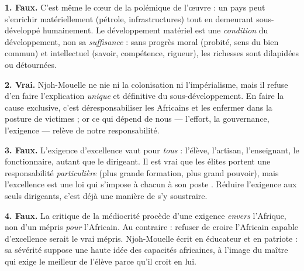 \documentclass[11pt]{article}
\begin{document}
\begin{corrige}

\textbf{1. Faux.} C'est même le cœur de la polémique de l'œuvre : un pays peut s'enrichir matériellement (pétrole, infrastructures) tout en demeurant sous-développé humainement. Le développement matériel est une \emph{condition} du développement, non sa \emph{suffisance} : sans progrès moral (probité, sens du bien commun) et intellectuel (savoir, compétence, rigueur), les richesses sont dilapidées ou détournées.

\textbf{2. Vrai.} Njoh-Mouelle ne nie ni la colonisation ni l'impérialisme, mais il refuse d'en faire l'explication \emph{unique} et définitive du sous-développement. En faire la cause exclusive, c'est déresponsabiliser les Africains et les enfermer dans la posture de victimes ; or ce qui dépend de nous — l'effort, la gouvernance, l'exigence — relève de notre responsabilité.

\textbf{3. Faux.} L'exigence d'excellence vaut pour \emph{tous} : l'élève, l'artisan, l'enseignant, le fonctionnaire, autant que le dirigeant. Il est vrai que les élites portent une responsabilité \emph{particulière} (plus grande formation, plus grand pouvoir), mais l'excellence est une loi qui s'impose à chacun \guillemotleft à son poste \guillemotright. Réduire l'exigence aux seuls dirigeants, c'est déjà une manière de s'y soustraire.

\textbf{4. Faux.} La critique de la médiocrité procède d'une exigence \emph{envers} l'Afrique, non d'un mépris \emph{pour} l'Africain. Au contraire : refuser de croire l'Africain capable d'excellence serait le vrai mépris. Njoh-Mouelle écrit en éducateur et en patriote : sa sévérité suppose une haute idée des capacités africaines, à l'image du maître qui exige le meilleur de l'élève parce qu'il croit en lui.
\end{corrige}
\end{document}
